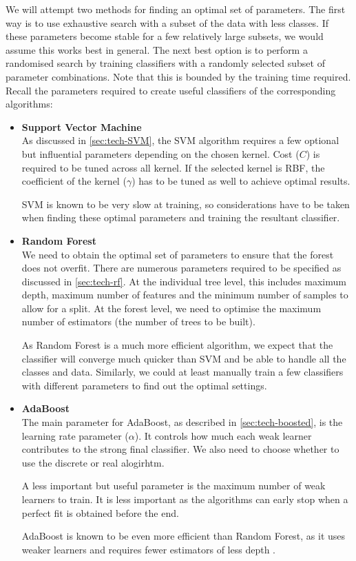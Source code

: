 We will attempt two methods for finding an optimal set of parameters. The first way is to use exhaustive search with a subset of the data with less classes. If these parameters become stable for a few relatively large subsets, we would assume this works best in general. The next best option is to perform a randomised search by training classifiers with a randomly selected subset of parameter combinations. Note that this is bounded by the training time required. \\

Recall the parameters required to create useful classifiers of the corresponding algorithms:

\begin{itemize}
  \item \textbf{Support Vector Machine} \\
    As discussed in \autoref{sec:tech-SVM}, the SVM algorithm requires a few optional but influential parameters depending on the chosen kernel. Cost ($C$) is required to be tuned across all kernel. If the selected kernel is RBF, the coefficient of the kernel ($\gamma$) has to be tuned as well to achieve optimal results. 

    SVM is known to be very slow at training, so considerations have to be taken when finding these optimal parameters and training the resultant classifier.

  \item \textbf{Random Forest} \\
    We need to obtain the optimal set of parameters to ensure that the forest does not overfit. There are numerous parameters required to be specified as discussed in \autoref{sec:tech-rf}. At the individual tree level, this includes maximum depth, maximum number of features and the minimum number of samples to allow for a split. At the forest level, we need to optimise the maximum number of estimators (the number of trees to be built).

As Random Forest is a much more efficient algorithm, we expect that the classifier will converge much quicker than SVM and be able to handle all the classes and data. Similarly, we could at least manually train a few classifiers with different parameters to find out the optimal settings. \\

  \item \textbf{AdaBoost} \\
    The main parameter for AdaBoost, as described in \autoref{sec:tech-boosted}, is the learning rate parameter ($\alpha$). It controls how much each weak learner contributes to the strong final classifier. We also need to choose whether to use the discrete or real alogirhtm. 
    
    A less important but useful parameter is the maximum number of weak learners to train. It is less important as the algorithms can early stop when a perfect fit is obtained before the end.

    AdaBoost is known to be even more efficient than Random Forest, as it uses weaker learners and requires fewer estimators of less depth \cite{boosting}. 
\end{itemize}


